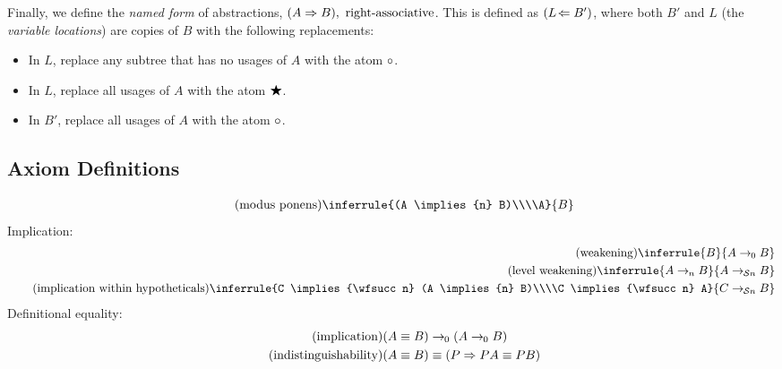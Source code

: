 \documentclass{article}
\begin{document}
  Finally, we define the \emph{named form} of abstractions, $(A \Rightarrow B),\ \operatorname{right-associative}$.
  This is defined as $(L\!\Leftarrow{B'})$, where both $B'$ and $L$ (the \emph{variable locations}) are copies of $B$ with the following replacements:
  \begin{itemize}
    \item In $L$, replace any subtree that has no usages of $A$ with the atom $\circ$.
    \item In $L$, replace all usages of $A$ with the atom $\bigstar$.
    \item In $B'$, replace all usages of $A$ with the atom $\circ$.
  \end{itemize}

  \subsection{Axiom Definitions}
  \setlength{\jot}{1.4em}
  \begin{gather*}
    \tag{modus ponens}\label{mp}
    \inferrule{(A \implies{n} B)\\\\A}{B}\\
  \end{gather*}
  Implication:
  \begin{align*}
    \tag{weakening}
    \inferrule{B}{A \implies{\wfz} B}\\
    \tag{level weakening}
    \inferrule{A \implies{n} B}{A \implies{\wfsucc n} B}\\
    \tag{implication within hypotheticals}
    \inferrule{C \implies{\wfsucc n} (A \implies{n} B)\\\\C \implies{\wfsucc n} A}{C \implies{\wfsucc n} B}\\
  \end{align*}
  \setlength{\jot}{0.4em}
  Definitional equality:
  \begin{align*}
    \tag{implication}
    (A \equiv B) &\rightarrow_{\hspace{-0.04em}0} (A \rightarrow_{\hspace{-0.04em}0} B)\\
    \tag{indistinguishability}
    (A \equiv B) &\equiv (P \Rightarrow PA \equiv PB)\\
  \end{align*}
\end{document}
